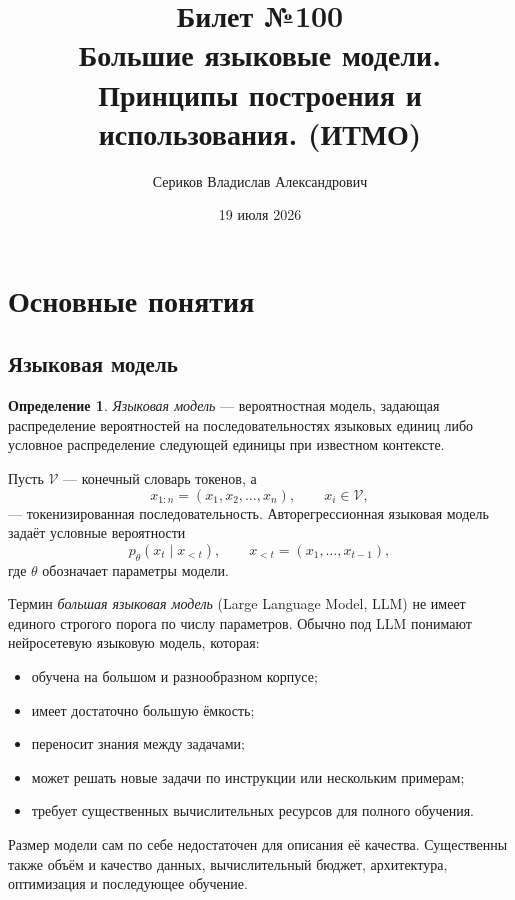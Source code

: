 \documentclass[12pt,a4paper]{article}
\title{Билет №100 \\ \small Большие языковые модели. Принципы построения и использования. (ИТМО)}
\author{Сериков Владислав Александрович}
\date{19 июля 2026}
\newcommand{\V}{\mathcal{V}}
\newcommand{\1}{\mathbf{1}}
\theoremstyle{definition}
\newtheorem{definition}[theorem]{Определение}
\theoremstyle{remark}
\begin{document}
\maketitle
\tableofcontents
\newpage

\section{Основные понятия}

\subsection{Языковая модель}

\begin{definition}
\emph{Языковая модель} --- вероятностная модель, задающая распределение
вероятностей на последовательностях языковых единиц либо условное
распределение следующей единицы при известном контексте.
\end{definition}

Пусть $\V$ --- конечный словарь токенов, а
\[
x_{1:n}=(x_1,x_2,\ldots,x_n), \qquad x_i\in\V,
\]
--- токенизированная последовательность. Авторегрессионная языковая модель
задаёт условные вероятности
\[
p_\theta(x_t\mid x_{<t}),
\qquad
x_{<t}=(x_1,\ldots,x_{t-1}),
\]
где $\theta$ обозначает параметры модели.

Термин \emph{большая языковая модель} (Large Language Model, LLM) не имеет
единого строгого порога по числу параметров. Обычно под LLM понимают
нейросетевую языковую модель, которая:

\begin{itemize}
    \item обучена на большом и разнообразном корпусе;
    \item имеет достаточно большую ёмкость;
    \item переносит знания между задачами;
    \item может решать новые задачи по инструкции или нескольким примерам;
    \item требует существенных вычислительных ресурсов для полного обучения.
\end{itemize}

Размер модели сам по себе недостаточен для описания её качества. Существенны
также объём и качество данных, вычислительный бюджет, архитектура,
оптимизация и последующее обучение.
\end{document}
